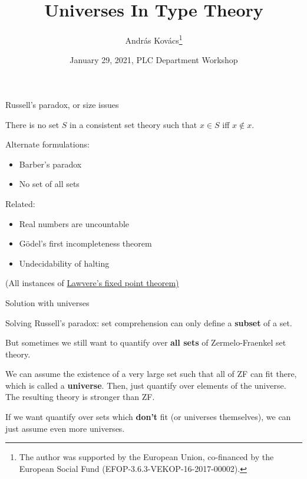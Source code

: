 \documentclass[dvipsnames,10pt,aspectratio=169]{beamer}
\title{Universes In Type Theory}
\date{January 29, 2021, PLC Department Workshop}
\author{\vspace{-1em}András Kovács\footnote{The author was supported by the European Union, co-financed by the
European Social Fund (EFOP-3.6.3-VEKOP-16-2017-00002).\vspace{0.5em}}}
\institute{Eötvös Loránd University, Budapest}
\begin{document}
\maketitle


\begin{frame}{Russell's paradox, or size issues}

There is no set $S$ in a consistent set theory such that $x \in S$ iff $x \notin x$.
\vspace{1em}

Alternate formulations:
\begin{itemize}
  \item Barber's paradox
  \item No set of all sets
\end{itemize}
\vspace{1em}

Related:
\begin{itemize}
  \item Real numbers are uncountable
  \item Gödel's first incompleteness theorem
  \item Undecidability of halting
\end{itemize}
\vspace{1em}

{\footnotesize (All instances of \href{https://arxiv.org/pdf/math/0305282.pdf}{Lawvere's fixed point theorem)}}
\end{frame}


\begin{frame}{Solution with universes}

Solving Russell's paradox: set comprehension can only define a \textbf{subset} of a set.
\vspace{1em}

But sometimes we still want to quantify over \textbf{all sets} of
Zermelo-Fraenkel set theory.
\vspace{1em}

We can assume the existence of a very large set such that all of ZF can fit there,
which is called a \textbf{universe}. Then, just quantify over elements of the
universe. The resulting theory is stronger than ZF.
\vspace{1em}

If we want quantify over sets which \textbf{don't} fit (or universes
themselves), we can just assume even more universes.

\end{frame}
\end{document}
